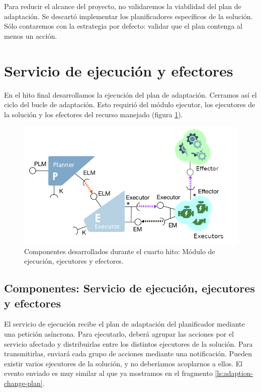 Para reducir el alcance del proyecto, no validaremos la viabilidad del plan de adaptación. Se descartó implementar los planificadores específicos de la solución.  Sólo contaremos con la estrategia por defecto: validar que el plan contenga al menos un acción.


\section{Servicio de ejecución y efectores}


En el hito final desarrollamos la ejecución del plan de adaptación. Cerramos así el ciclo del bucle de adaptación. Esto requirió del módulo ejecutor, los ejecutores de la solución y los efectores del recurso manejado (figura \ref{fig:hito-4-ejecutor}).

\begin{figure}[h!]
  \centering
  \includegraphics[scale=0.55]{cap_implementacion/images/hito-4-ejecutor}
  \caption{Componentes desarrollados durante el cuarto hito: Módulo de ejecución, ejecutores y efectores.}
  \label{fig:hito-4-ejecutor}
\end{figure}

\subsection{Componentes: Servicio de ejecución, ejecutores y efectores}

El servicio de ejecución recibe el plan de adaptación del planificador mediante una petición asíncrona. Para ejecutarlo, deberá agrupar las acciones por el servicio afectado y distribuirlas entre los distintos ejecutores de la solución. Para transmitirlas, enviará cada grupo de acciones mediante una notificación. Pueden existir varios ejecutores de la solución, y no deberíamos acoplarnos a ellos. El evento enviado es muy similar al que ya mostramos en el fragmento \ref{ls:adaption-change-plan}.

